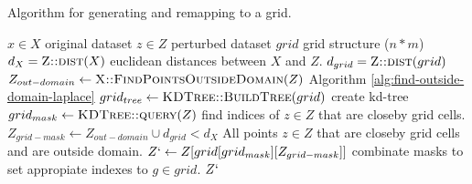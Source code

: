 \begin{algorithm}[H]
  \caption{Algorithm for generating and remapping to a grid.}
  \begin{algorithmic}
    \Require $x \in X$  \Comment original dataset
    \Require $z \in Z$ \Comment perturbed dataset
    \Require $grid$ \Comment grid structure ($n * m$)
    \State $d_{X} = \Call{Z::dist}{X}$ \Comment euclidean distances between $X$ and $Z$.
    \State $d_{grid} = \Call{Z::dist}{grid}$
    \State $Z_{out-domain} \gets \Call{X::FindPointsOutsideDomain}{Z}$ \Comment Algorithm \ref{alg:find-outside-domain-laplace}
    \State $grid_{tree} \gets \Call{KDTree::BuildTree}{grid}$  \Comment create kd-tree
    \State $grid_{mask} \gets \Call{KDTree::query}{Z}$ \Comment find indices of $z \in Z$ that are closeby grid cells.
    \State $Z_{grid-mask} \gets Z_{out-domain} \cup d_{grid} < d_{X}$ \Comment All points $z \in Z$ that are closeby grid cells and are outside domain.
    \State $Z` \gets Z[grid[grid_{mask}][Z_{grid-mask}]]$ \Comment combinate masks to set appropiate indexes to $g \in grid$.
    \State \Return $Z`$
  \end{algorithmic}
  \label{alg:grid-remapping-laplace}
\end{algorithm}